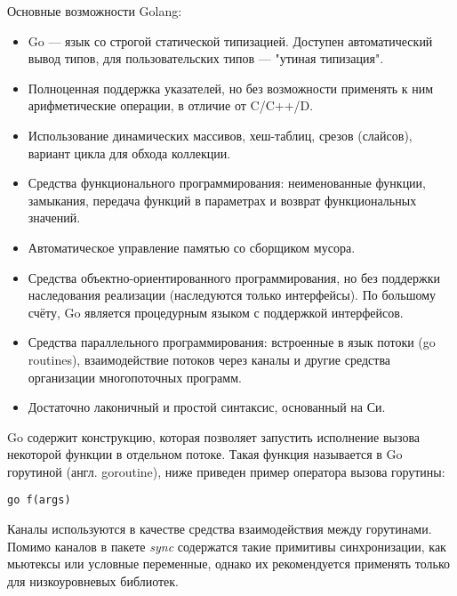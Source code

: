 Основные возможности Golang:
\begin{itemize}
    \item Go — язык со строгой статической типизацией. Доступен автоматический вывод типов, для пользовательских типов — "утиная типизация".
    \item Полноценная поддержка указателей, но без возможности применять к ним арифметические операции, в отличие от C/C++/D.
    \item Использование динамических массивов, хеш-таблиц, срезов (слайсов), вариант цикла для обхода коллекции.
    \item Средства функционального программирования: неименованные функции, замыкания, передача функций в параметрах и возврат функциональных значений.
    \item Автоматическое управление памятью со сборщиком мусора.
    \item Средства объектно-ориентированного программирования, но без поддержки наследования реализации (наследуются только интерфейсы). По большому счёту, Go является процедурным языком с поддержкой интерфейсов.
    \item Средства параллельного программирования: встроенные в язык потоки (go routines), взаимодействие потоков через каналы и другие средства организации многопоточных программ.
    \item Достаточно лаконичный и простой синтаксис, основанный на Си.
\end{itemize}

Go содержит конструкцию, которая позволяет запустить исполнение вызова некоторой функции в отдельном потоке. Такая функция называется в Go горутиной (англ. goroutine), ниже приведен пример оператора вызова горутины: 

\begin{lstlisting}[numbers=none, language=Golang, caption=Пример вызова горутины]
    go f(args) 
\end{lstlisting} 

Каналы используются в качестве средства взаимодействия между горутинами. Помимо каналов в пакете \textit{sync} содержатся такие примитивы синхронизации, как мьютексы или условные переменные, однако их рекомендуется применять только для низкоуровневых библиотек.


